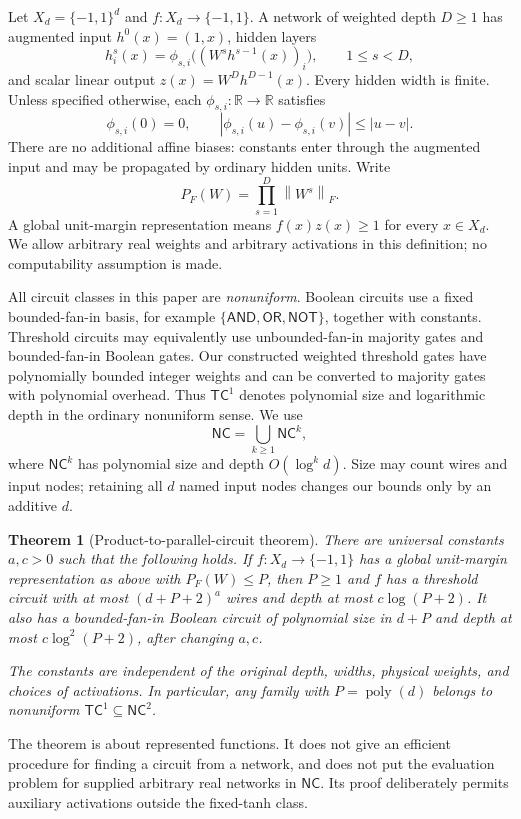 \documentclass[11pt]{article}
\newtheorem{theorem}{Theorem}[section]
\theoremstyle{remark}
\newcommand{\R}{\mathbb R}
\newcommand{\poly}{\operatorname{poly}}
\newcommand{\TC}{\mathsf{TC}}
\newcommand{\NC}{\mathsf{NC}}
\newcommand{\norm}[1]{\left\lVert #1\right\rVert}
\begin{document}
Let $X_d=\{-1,1\}^d$ and $f:X_d\to\{-1,1\}$. A network of weighted
depth $D\ge1$ has augmented input $h^0(x)=(1,x)$, hidden layers
\[
 h^s_i(x)=\phi_{s,i}\bigl((W^s h^{s-1}(x))_i\bigr),
 \qquad 1\le s<D,
\]
and scalar linear output $z(x)=W^D h^{D-1}(x)$. Every hidden width is
finite. Unless specified otherwise, each $\phi_{s,i}:\R\to\R$ satisfies
\[
 \phi_{s,i}(0)=0,\qquad
 |\phi_{s,i}(u)-\phi_{s,i}(v)|\le |u-v|.
\]
There are no additional affine biases: constants enter through the
augmented input and may be propagated by ordinary hidden units.
Write
\[
 P_F(W)=\prod_{s=1}^D\norm{W^s}_F.
\]
A global unit-margin representation means $f(x)z(x)\ge1$ for every
$x\in X_d$. We allow arbitrary real weights and arbitrary activations
in this definition; no computability assumption is made.

All circuit classes in this paper are \emph{nonuniform}. Boolean
circuits use a fixed bounded-fan-in basis, for example
$\{\mathsf{AND},\mathsf{OR},\mathsf{NOT}\}$, together with constants.
Threshold circuits may equivalently use unbounded-fan-in majority
gates and bounded-fan-in Boolean gates. Our constructed weighted
threshold gates have polynomially bounded integer weights and can be
converted to majority gates with polynomial overhead. Thus $\TC^1$
denotes polynomial size and logarithmic depth in the ordinary
nonuniform sense. We use
\[
 \NC=\bigcup_{k\ge1}\NC^k,
\]
where $\NC^k$ has polynomial size and depth $O(\log^k d)$.
Size may count wires and input nodes; retaining all $d$ named input
nodes changes our bounds only by an additive $d$.

\begin{theorem}[Product-to-parallel-circuit theorem]
\label{thm:main}
There are universal constants $a,c>0$ such that the following holds.
If $f:X_d\to\{-1,1\}$ has a global unit-margin representation as above
with $P_F(W)\le P$, then $P\ge1$ and $f$ has a threshold circuit with
at most $(d+P+2)^a$ wires and depth at most $c\log(P+2)$.
It also has a bounded-fan-in Boolean circuit of polynomial size in
$d+P$ and depth at most $c\log^2(P+2)$, after changing $a,c$.

The constants are independent of the original depth, widths, physical
weights, and choices of activations. In particular, any family with
$P=\poly(d)$ belongs to nonuniform $\TC^1\subseteq\NC^2$.
\end{theorem}

The theorem is about represented functions. It does not give an
efficient procedure for finding a circuit from a network, and does not
put the evaluation problem for supplied arbitrary real networks in
$\NC$. Its proof deliberately permits auxiliary activations outside
the fixed-tanh class.
\end{document}
